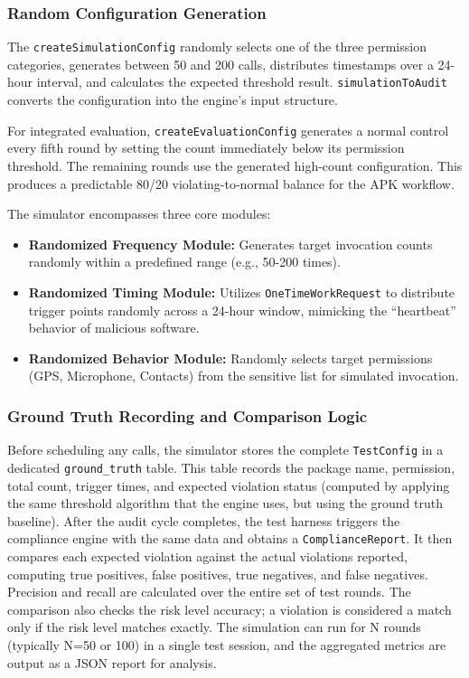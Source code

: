 \subsubsection{Random Configuration Generation}

The \texttt{createSimulationConfig} randomly selects one of the three permission categories, generates between 50 and 200 calls, distributes timestamps over a 24-hour interval, and calculates the expected threshold result. \texttt{simulationToAudit} converts the configuration into the engine's input structure.

For integrated evaluation, \texttt{createEvaluationConfig} generates a normal control every fifth round by setting the count immediately below its permission threshold. The remaining rounds use the generated high-count configuration. This produces a predictable 80/20 violating-to-normal balance for the APK workflow.

The simulator encompasses three core modules:
\begin{itemize}
\item \textbf{Randomized Frequency Module:} Generates target invocation counts randomly within a predefined range (e.g., 50-200 times).
\item \textbf{Randomized Timing Module:} Utilizes \texttt{OneTimeWorkRequest} to distribute trigger points randomly across a 24-hour window, mimicking the ``heartbeat'' behavior of malicious software.
\item \textbf{Randomized Behavior Module:} Randomly selects target permissions (GPS, Microphone, Contacts) from the sensitive list for simulated invocation.
\end{itemize}

\subsubsection{Ground Truth Recording and Comparison Logic}

Before scheduling any calls, the simulator stores the complete \texttt{TestConfig} in a dedicated \texttt{ground\_truth} table. This table records the package name, permission, total count, trigger times, and expected violation status (computed by applying the same threshold algorithm that the engine uses, but using the ground truth baseline). After the audit cycle completes, the test harness triggers the compliance engine with the same data and obtains a \texttt{ComplianceReport}. It then compares each expected violation against the actual violations reported, computing true positives, false positives, true negatives, and false negatives. Precision and recall are calculated over the entire set of test rounds. The comparison also checks the risk level accuracy; a violation is considered a match only if the risk level matches exactly. The simulation can run for N rounds (typically N=50 or 100) in a single test session, and the aggregated metrics are output as a JSON report for analysis.

